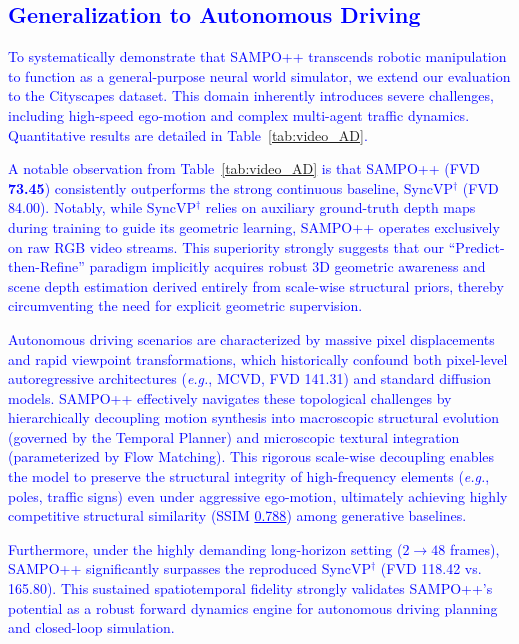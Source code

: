 \textcolor{blue}{\subsection{Generalization to Autonomous Driving}

To systematically demonstrate that SAMPO++ transcends robotic manipulation to function as a general-purpose neural world simulator, we extend our evaluation to the Cityscapes dataset. This domain inherently introduces severe challenges, including high-speed ego-motion and complex multi-agent traffic dynamics. Quantitative results are detailed in Table~\ref{tab:video_AD}.}

\textcolor{blue}{A notable observation from Table~\ref{tab:video_AD} is that SAMPO++ (FVD \textbf{73.45}) consistently outperforms the strong continuous baseline, SyncVP$^{\dagger}$ (FVD 84.00). Notably, while SyncVP$^{\dagger}$ relies on auxiliary ground-truth depth maps during training to guide its geometric learning, SAMPO++ operates exclusively on raw RGB video streams. This superiority strongly suggests that our ``Predict-then-Refine'' paradigm implicitly acquires robust 3D geometric awareness and scene depth estimation derived entirely from scale-wise structural priors, thereby circumventing the need for explicit geometric supervision.}


% 
\textcolor{blue}{Autonomous driving scenarios are characterized by massive pixel displacements and rapid viewpoint transformations, which historically confound both pixel-level autoregressive architectures (\textit{e.g.}, MCVD, FVD 141.31) and standard diffusion models. SAMPO++ effectively navigates these topological challenges by hierarchically decoupling motion synthesis into macroscopic structural evolution (governed by the Temporal Planner) and microscopic textural integration (parameterized by Flow Matching). This rigorous scale-wise decoupling enables the model to preserve the structural integrity of high-frequency elements (\textit{e.g.}, poles, traffic signs) even under aggressive ego-motion, ultimately achieving highly competitive structural similarity (SSIM \underline{0.788}) among generative baselines.}

\textcolor{blue}{Furthermore, under the highly demanding long-horizon setting ($2 \rightarrow 48$ frames), SAMPO++ significantly surpasses the reproduced SyncVP$^{\dagger}$ (FVD 118.42 vs. 165.80). This sustained spatiotemporal fidelity strongly validates SAMPO++'s potential as a robust forward dynamics engine for autonomous driving planning and closed-loop simulation.}


